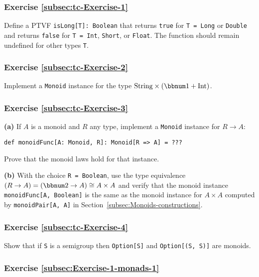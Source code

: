 \subsubsection{Exercise \label{subsec:tc-Exercise-1}\ref{subsec:tc-Exercise-1}}

Define a PTVF \lstinline!isLong[T]: Boolean! that returns \lstinline!true!
for \lstinline!T = Long! or \lstinline!Double! and returns \lstinline!false!
for \lstinline!T = Int!, \lstinline!Short!, or \lstinline!Float!.
The function should remain undefined for other types \lstinline!T!.

\subsubsection{Exercise \label{subsec:tc-Exercise-2}\ref{subsec:tc-Exercise-2}}

Implement a \lstinline!Monoid! instance for the type $\text{String}\times(\bbnum 1+\text{Int})$.

\subsubsection{Exercise \label{subsec:tc-Exercise-3}\ref{subsec:tc-Exercise-3}}

\textbf{(a)} If $A$ is a monoid and $R$ any type, implement a \lstinline!Monoid!
instance for $R\rightarrow A$:
\begin{lstlisting}
def monoidFunc[A: Monoid, R]: Monoid[R => A] = ???
\end{lstlisting}
Prove that the monoid laws hold for that instance.

\textbf{(b)} With the choice \lstinline!R = Boolean!, use the type
equivalence $(R\rightarrow A)=(\bbnum 2\rightarrow A)\cong A\times A$
and verify that the monoid instance \lstinline!monoidFunc[A, Boolean]!
is the same as the monoid instance for $A\times A$ computed by \lstinline!monoidPair[A, A]!
in Section~\ref{subsec:Monoids-constructions}.

\subsubsection{Exercise \label{subsec:tc-Exercise-4}\ref{subsec:tc-Exercise-4}}

Show that if \lstinline!S! is a semigroup then \lstinline!Option[S]!
and \lstinline!Option[(S, S)]! are monoids.

\subsubsection{Exercise \label{subsec:Exercise-1-monads-1}\ref{subsec:Exercise-1-monads-1}}

